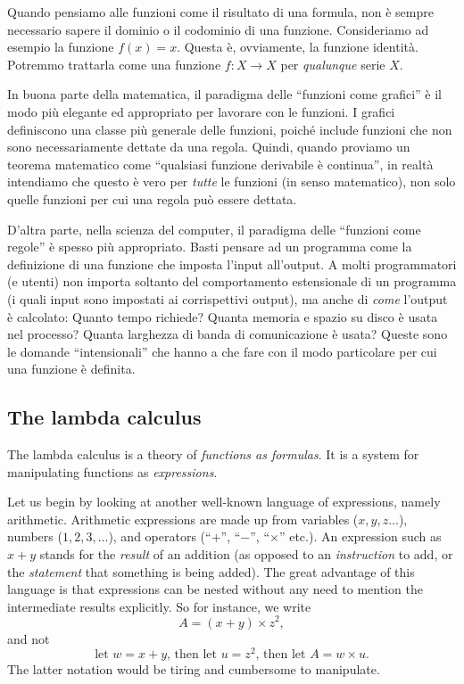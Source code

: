 \documentclass{article}
\begin{document}
Quando pensiamo alle funzioni come il risultato di una formula, non
\`e sempre necessario sapere il dominio o il codominio di una funzione. Consideriamo
ad esempio la funzione $f(x)=x$. Questa \`e, ovviamente, la funzione
identit\`a. Potremmo trattarla come una funzione $f:X\to X$ per {\em qualunque} serie $X$.

In buona parte della matematica, il paradigma delle 
``funzioni come grafici'' \`e il modo più elegante ed appropriato per lavorare con le funzioni. 
I grafici definiscono una classe più generale delle funzioni, poiché include
funzioni che non sono necessariamente dettate da una regola. Quindi, quando
proviamo un teorema matematico come ``qualsiasi funzione derivabile
\`e continua'', in realt\`a intendiamo che questo \`e vero per {\em tutte} le funzioni
(in senso matematico), non solo quelle funzioni per cui una regola può essere dettata.

D'altra parte, nella scienza del computer, il paradigma delle
``funzioni come regole'' \`e spesso più appropriato. Basti pensare ad un programma 
come la definizione di una funzione che imposta l'input all'output. A molti programmatori
(e utenti) non importa soltanto del comportamento estensionale di 
un programma (i quali input sono impostati ai corrispettivi output),
ma  anche di {\em come} l'output \`e calcolato: Quanto tempo richiede?
Quanta memoria e spazio su disco \`e usata nel processo? Quanta larghezza di 
banda di comunicazione \`e usata? Queste sono le domande ``intensionali'' che 
hanno a che fare con il modo particolare
per cui una funzione \`e definita.

\subsection{The lambda calculus}

The lambda calculus is a theory of {\em functions as formulas}. It is
a system for manipulating functions as {\em expressions}.  

Let us begin by looking at another well-known language of expressions,
namely arithmetic. Arithmetic expressions are made up from variables
($x,y,z\ldots$), numbers ($1,2,3,\ldots$), and operators (``$+$'',
``$-$'', ``$\times$'' etc.). An expression such as $x+y$ stands for
the {\em result} of an addition (as opposed to an {\em instruction} to
add, or the {\em statement} that something is being added). The great
advantage of this language is that expressions can be nested without
any need to mention the intermediate results explicitly. So for
instance, we write
\[   A = (x+y)\times z^2,   
\]
and not 
\[   \mbox{let $w=x+y$, then let $u=z^2$, then let $A=w\times u$.}    
\]
The latter notation would be tiring and cumbersome to manipulate. 
\end{document}
